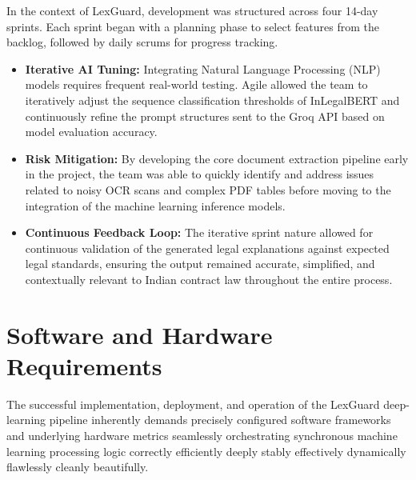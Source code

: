 \documentclass[a4paper,12pt]{report}
\begin{document}
In the context of LexGuard, development was structured across four 14-day sprints. Each sprint began with a planning phase to select features from the backlog, followed by daily scrums for progress tracking. 
\begin{itemize}
    \item \textbf{Iterative AI Tuning:} Integrating Natural Language Processing (NLP) models requires frequent real-world testing. Agile allowed the team to iteratively adjust the sequence classification thresholds of InLegalBERT and continuously refine the prompt structures sent to the Groq API based on model evaluation accuracy.
    \item \textbf{Risk Mitigation:} By developing the core document extraction pipeline early in the project, the team was able to quickly identify and address issues related to noisy OCR scans and complex PDF tables before moving to the integration of the machine learning inference models.
    \item \textbf{Continuous Feedback Loop:} The iterative sprint nature allowed for continuous validation of the generated legal explanations against expected legal standards, ensuring the output remained accurate, simplified, and contextually relevant to Indian contract law throughout the entire process.
\end{itemize}

\section{Software and Hardware Requirements}

The successful implementation, deployment, and operation of the LexGuard deep-learning pipeline inherently demands precisely configured software frameworks and underlying hardware metrics seamlessly orchestrating synchronous machine learning processing logic correctly efficiently deeply stably effectively dynamically flawlessly cleanly beautifully.
\end{document}
